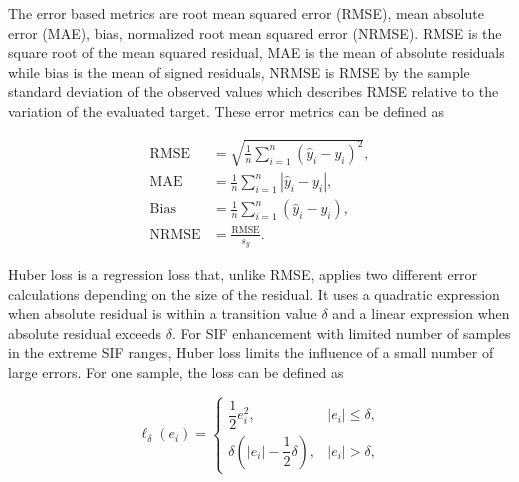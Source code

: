 The error based metrics are root mean squared error (RMSE), mean absolute error (MAE), bias, normalized root mean squared error (NRMSE). RMSE is the square root of the mean squared residual, MAE is the mean of absolute residuals while bias is the mean of signed residuals, NRMSE is RMSE by the sample standard deviation of the observed values which describes RMSE relative to the variation of the evaluated target. These error metrics can be defined as

\begin{align}
\mathrm{RMSE} &=
\sqrt{\frac{1}{n}\sum_{i=1}^{n}
\left(\widehat{y}_i-y_i\right)^2},
\label{eq:rmse_definition}\\
\mathrm{MAE} &=
\frac{1}{n}\sum_{i=1}^{n}
\left|\widehat{y}_i-y_i\right|,
\label{eq:mae_definition}\\
\mathrm{Bias} &=
\frac{1}{n}\sum_{i=1}^{n}
\left(\widehat{y}_i-y_i\right),
\label{eq:bias_definition}\\
\mathrm{NRMSE} &= \frac{\mathrm{RMSE}}{s_y}.
\label{eq:nrmse_definition}
\end{align}

Huber loss is a regression loss that, unlike RMSE, applies two different error calculations depending on the size of the residual. It uses a quadratic expression when absolute residual is within a transition value \(\delta\) and a linear expression when absolute residual exceeds \(\delta\). For SIF enhancement with limited number of samples in the extreme SIF ranges, Huber loss limits the influence of a small number of large errors. For one sample, the loss can be defined as

\begin{equation}
\ell_{\delta}(e_i)=
\begin{cases}
\dfrac{1}{2}e_i^2, & \left|e_i\right|\leq\delta,\\[4pt]
\delta\left(\left|e_i\right|-\dfrac{1}{2}\delta\right),
& \left|e_i\right|>\delta,
\end{cases}
\label{eq:huber_sample_loss}
\end{equation}
